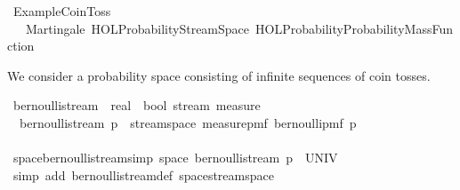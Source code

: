 %
\begin{isabellebody}%
%
%
\isadelimtheory
\isanewline
\isanewline
%
\endisadelimtheory
%
\isatagtheory
{}\isamarkupfalse%
\ Example{\isacharunderscore}{\kern0pt}Coin{\isacharunderscore}{\kern0pt}Toss\isanewline
\ \ \ Martingale\ {\isachardoublequoteopen}HOL{\isacharminus}{\kern0pt}Probability{\isachardot}{\kern0pt}Stream{\isacharunderscore}{\kern0pt}Space{\isachardoublequoteclose}\ {\isachardoublequoteopen}HOL{\isacharminus}{\kern0pt}Probability{\isachardot}{\kern0pt}Probability{\isacharunderscore}{\kern0pt}Mass{\isacharunderscore}{\kern0pt}Function{\isachardoublequoteclose}\isanewline
{}%
\endisatagtheory
{\isafoldtheory}%
%
\isadelimtheory
%
\endisadelimtheory
%
\isadelimdocument
%
\endisadelimdocument
%
\isatagdocument
%
\isamarkuptrue%
%
\endisatagdocument
{\isafolddocument}%
%
\isadelimdocument
%
\endisadelimdocument
%
\begin{isamarkuptext}%
We consider a probability space consisting of infinite sequences of coin tosses.%
\end{isamarkuptext}\isamarkuptrue%
\isamarkupfalse%
\ bernoulli{\isacharunderscore}{\kern0pt}stream\ {\isacharcolon}{\kern0pt}{\isacharcolon}{\kern0pt}\ {\isachardoublequoteopen}real\ {\isasymRightarrow}\ {\isacharparenleft}{\kern0pt}bool\ stream{\isacharparenright}{\kern0pt}\ measure{\isachardoublequoteclose}\ \isanewline
\ \ {\isachardoublequoteopen}bernoulli{\isacharunderscore}{\kern0pt}stream\ p\ {\isacharequal}{\kern0pt}\ stream{\isacharunderscore}{\kern0pt}space\ {\isacharparenleft}{\kern0pt}measure{\isacharunderscore}{\kern0pt}pmf\ {\isacharparenleft}{\kern0pt}bernoulli{\isacharunderscore}{\kern0pt}pmf\ p{\isacharparenright}{\kern0pt}{\isacharparenright}{\kern0pt}{\isachardoublequoteclose}\isanewline
\ \ \ \ \ \ \ \ \ \ \ \ \ \ \ \ \ \ \ \ \ \ \ \ \ \ \ \ \ \ \ \ \ \ \isanewline
{}\isamarkupfalse%
\ space{\isacharunderscore}{\kern0pt}bernoulli{\isacharunderscore}{\kern0pt}stream{\isacharbrackleft}{\kern0pt}simp{\isacharbrackright}{\kern0pt}{\isacharcolon}{\kern0pt}\ {\isachardoublequoteopen}space\ {\isacharparenleft}{\kern0pt}bernoulli{\isacharunderscore}{\kern0pt}stream\ p{\isacharparenright}{\kern0pt}\ {\isacharequal}{\kern0pt}\ UNIV{\isachardoublequoteclose}%
\isadelimproof
\ %
\endisadelimproof
%
\isatagproof
{}\isamarkupfalse%
\ {\isacharparenleft}{\kern0pt}simp\ add{\isacharcolon}{\kern0pt}\ bernoulli{\isacharunderscore}{\kern0pt}stream{\isacharunderscore}{\kern0pt}def\ space{\isacharunderscore}{\kern0pt}stream{\isacharunderscore}{\kern0pt}space{\isacharparenright}{\kern0pt}%

\end{isabellebody}
